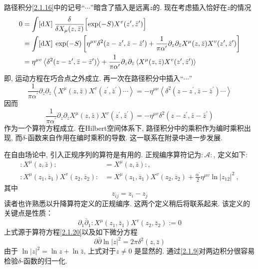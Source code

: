 路径积分\eqref{2.1.16}中的记号“$\cdots$”暗含了插入是远离$z$的. 
现在考虑插入恰好在$z$的情况
\begin{align}
0 &=\int[\mathrm{d} X] \: \frac{\delta}{\delta X_{\mu}(z, \bar{z})}\Bigl[\exp (-S) X^{v}(z^{\prime}, \bar{z}^{\prime})\Bigr] \nonumber \\
&=\int[\mathrm{d} X]\: \exp (-S)\left[\eta^{\mu v} \delta^{2}(z-z^{\prime}, \bar{z}-\bar{z}^{\prime})+\frac{1}{\pi \alpha^{\prime}} \partial_{z} \partial_{\bar{z}} X^{\mu}(z, \bar{z}) X^{v}(z^{\prime}, \bar{z}^{\prime})\right] \nonumber \\
&=\eta^{\mu v}\left\langle\delta^{2}(z-z^{\prime}, \bar{z}-\bar{z}^{\prime})\right\rangle+\frac{1}{\pi \alpha^{\prime}} \partial_{z} \partial_{\bar{z}}\left\langle X^{\mu}(z, \bar{z}) X^{v}(z^{\prime}, \bar{z}^{\prime})\right\rangle \label{2.1.18}
\end{align}
即, 运动方程在巧合点之外成立. 再一次在路径积分中插入“$\cdots$”
\begin{equation}
\frac{1}{\pi \alpha^{\prime}} \partial_{z} \partial_{\bar{z}}\left\langle X^{\mu}(z, \bar{z}) X^{v}(z^{\prime}, \bar{z}^{\prime}) \cdots\right\rangle=-\eta^{\mu \nu}\left\langle\delta^{2}(z-z^{\prime}, \bar{z}-\bar{z}^{\prime}) \cdots\right\rangle
\end{equation}
因而
\begin{equation}
\frac{1}{\pi \alpha^{\prime}} \partial_{z} \partial_{\bar{z}} X^{\mu}(z, \bar{z}) X^{v}(z^{\prime}, \bar{z}^{\prime})=-\eta^{\mu v} \delta^{2}(z-z^{\prime}, \bar{z}-\bar{z}^{\prime}) \label{2.1.20}
\end{equation}
作为一个算符方程成立. 在Hilbert空间体系下, 路径积分中的乘积作为编时乘积出现, 而$\delta$-函数来自作用在编时乘积的导数. 这一联系在附录中进一步发展. 

在自由场论中, 引入正规序列的算符是有用的. 正规编序算符记为$:\mathrel{\mathscr{A}}:$, 定义如下:
\begin{subequations} \label{2.1.21}
\begin{align}
: \mathrel{X^{\mu}(z, \bar{z})}:&=X^{\mu}(z, \bar{z}) :, \label{2.1.21a}\\
: \mathrel{X^{\mu}(z_{1}, \bar{z}_{1}) X^{v}(z_{2}, \bar{z}_{2})}:&=X^{\mu}\left(z_{1}, \bar{z}_{1}\right) X^{v}(z_{2}, \bar{z}_{2})+\frac{\alpha^{\prime}}{2} \eta^{\mu v} \ln \lvert z_{12}\rvert^{2} \:, \label{2.1.21b}
\end{align}
\end{subequations}
其中
\begin{equation}
z_{i j}=z_{i}-z_{j}
\end{equation}
读者也许熟悉以升降算符定义的正规编序. 这两个定义稍后将联系起来. 
该定义的关键点是性质：
\begin{equation}
\partial_{1} \bar{\partial}_{1}\!\!:\mathrel{X^{\mu}(z_{1}, \bar{z}_{1}) X^{v}(z_{2}, \bar{z}_{2})}:=0 \label{2.1.23}
\end{equation}
上式源于算符方程\eqref{2.1.20}以及如下微分方程
\begin{equation}
\partial \bar{\partial} \ln |z|^{2}=2 \pi \delta^{2}(z, \bar{z})
\end{equation}
由于 $\ln |z|^{2}=\ln z+\ln \bar{z}$, 上式对于$z \neq 0$ 是显然的. 通过\eqref{2.1.9}对两边积分很容易检验$\delta$-函数的归一化.

